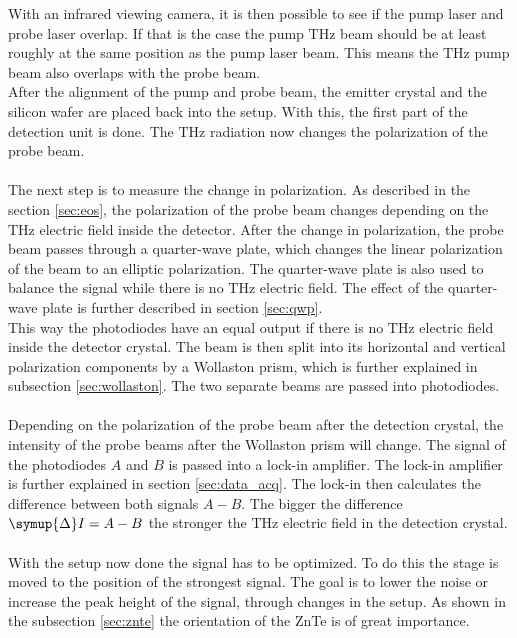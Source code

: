 With an infrared viewing camera, it is then possible to see if the pump laser and probe laser overlap.
If that is the case the pump $\si{\tera\hertz}$ beam should be at least roughly at the same position as the pump laser beam.
This means the $\si{\tera\hertz}$ pump beam also overlaps with the probe beam.
\\
After the alignment of the pump and probe beam, the emitter crystal and the silicon wafer are placed back into the setup.
With this, the first part of the detection unit is done.
The $\si{\tera\hertz}$ radiation now changes the polarization of the probe beam.
\\\\
The next step is to measure the change in polarization.
As described in the section \ref{sec:eos}, the polarization of the probe beam changes depending on the $\si{\tera\hertz}$ electric field inside the detector.
After the change in polarization, the probe beam passes through a quarter-wave plate, which changes the linear polarization of the beam to an elliptic polarization.
The quarter-wave plate is also used to balance the signal while there is no $\si{\tera\hertz}$ electric field.
The effect of the quarter-wave plate is further described in section \ref{sec:qwp}.
\\
This way the photodiodes have an equal output if there is no $\si{\tera\hertz}$ electric field inside the detector crystal.
The beam is then split into its horizontal and vertical polarization components by a Wollaston prism, which is further explained in subsection \ref{sec:wollaston}.
The two separate beams are passed into photodiodes.
\\\\
Depending on the polarization of the probe beam after the detection crystal, the intensity of the probe beams after the Wollaston prism will change.
The signal of the photodiodes $A$ and $B$ is passed into a lock-in amplifier.
The lock-in amplifier is further explained in section \ref{sec:data_acq}.
The lock-in then calculates the difference between both signals $A-B$.
The bigger the difference $\symup{\Delta}I = A-B$ the stronger the $\si{\tera\hertz}$ electric field in the detection crystal.
\\\\
With the setup now done the signal has to be optimized.
To do this the stage is moved to the position of the strongest signal.
The goal is to lower the noise or increase the peak height of the signal, through changes in the setup.
As shown in the subsection \ref{sec:znte} the orientation of the ZnTe is of great importance.
